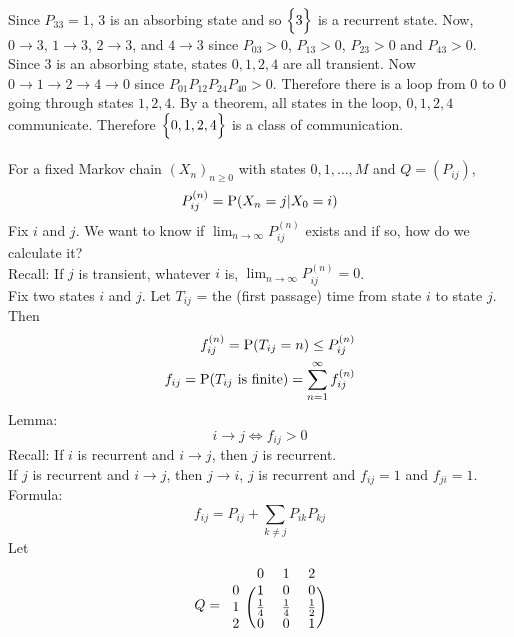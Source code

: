 \documentclass[12pt]{article}
\begin{document}
Since $P_{33} = 1$, $3$ is an absorbing state and so $\Big\{ 3 \Big\}$ is a recurrent state. Now, $0 \to 3$, $1\to3$, $2\to3$, and $4\to3$ since $P_{03}>0$, $P_{13}>0$, $P_{23}>0$ and $P_{43}>0$. Since $3$ is an absorbing state, states $0,1,2,4$ are all transient. Now $0\to1\to2\to4\to0$ since $P_{01}P_{12}P_{24}P_{40} > 0$. Therefore there is a loop from $0$ to $0$ going through states $1,2,4$. By a theorem, all states in the loop, $0,1,2,4$ communicate. Therefore $\Big\{ 0,1,2,4 \Big\}$ is a class of communication. \\~\\
For a fixed Markov chain $(X_n)_{n\geq0}$ with states $0,1,\dots,M$ and $Q = (P_{ij})$, $$ P_{ij}^{(n)} = \mathrm{P}( X_n = j | X_0 = i )$$ Fix $i$ and $j$. We want to know if $\lim_{n\to \infty} P_{ij}^{(n)}$ exists and if so, how do we calculate it? \\
Recall: If $j$ is transient, whatever $i$ is, $\lim_{n\to\infty} P_{ij}^{(n)} = 0$. \\
Fix two states $i$ and $j$. Let $T_{ij}$ = the (first passage) time from state $i$ to state $j$. Then $$ \begin{aligned} 
f_{ij}^{(n)} = \mathrm{P}( T_{ij} = n ) \leq P_{ij}^{(n)} \\ f_{ij} = \mathrm{P}( T_{ij} \text{ is finite} ) = \sum_{n=1}^\infty f_{ij}^{(n)} \end{aligned} $$ 
Lemma:  $$i \to j \iff f_{ij} > 0$$
Recall: If $i$ is recurrent and $i \to j$, then $j$ is recurrent. \\
If $j$ is recurrent and $i \to j$, then $j \to i$, $j$ is recurrent and $f_{ij} = 1$ and $f_{ji} = 1$. \\
Formula: $$f_{ij} = P_{ij} + \sum_{k \neq j} P_{ik}P_{kj} $$ 
Let $$Q = \begin{blockarray}{cccc}
&0&1&2 \\
\begin{block}{c(ccc)}
0 & 1 & 0 & 0  \\
1 & \frac{1}{4} & \frac{1}{4} & \frac{1}{2}  \\ 
2 & 0 & 0 & 1  \\  \end{block} \end{blockarray} $$
\end{document}
